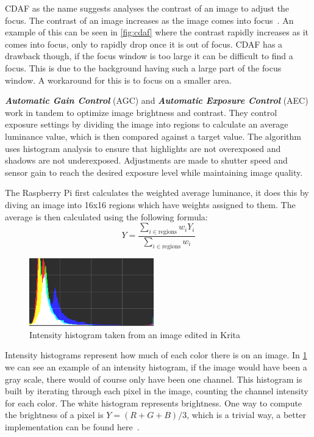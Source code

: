CDAF as the name suggests analyses the contrast of an image to adjust the
focus. The contrast of an image increases as the image comes into focus~\cite{xu2011robust}.
An example of this can be seen in \cref{fig:cdaf} where the contrast rapidly
increases as it comes into focus, only to rapidly drop once it is out of focus.
CDAF has a drawback though, if the focus window is too large it can be difficult
to find a focus. This is due to the background having such a large part of the
focus window. A workaround for this is to focus on a smaller area.

\textit{\textbf{Automatic Gain Control}} (AGC) and \textit{\textbf{Automatic
Exposure Control}} (AEC) work in tandem to optimize image brightness and
contrast. They control exposure settings by dividing the image into regions to
calculate an average luminance value, which is then compared against a target
value. The algorithm uses histogram analysis to ensure that highlights are not
overexposed and shadows are not underexposed. Adjustments are made to shutter
speed and sensor gain to reach the desired exposure level while maintaining
image quality.

The Raspberry Pi first calculates the weighted average luminance, it does this
by diving an image into 16x16 regions which have weights assigned to them. The
average is then calculated using the following formula:~\[Y = \frac{\sum_{i \in \text{regions}} w_i Y_i}{\sum_{i \in \text{regions}} w_i}\]

\begin{figure}
    \centering
    \includegraphics[width=0.48\textwidth]{figures/histogram.png}
    \caption{Intensity histogram taken from an image edited in Krita}
    \label{fig:intensityhistogram}
\end{figure}
Intensity histograms represent how much of each color there is on an image. In
\cref{fig:intensityhistogram} we can see an example of an intensity histogram,
if the image would have been a gray scale, there would of course only have been
one channel. This histogram is built by iterating through each pixel in the
image, counting the channel intensity for each color. The white histogram
represents brightness. One way to compute the brightness of a pixel is $Y = (R
+ G + B) / 3$, which is a trivial way, a better implementation can be found
here~\cite{kumar2010theory}.

